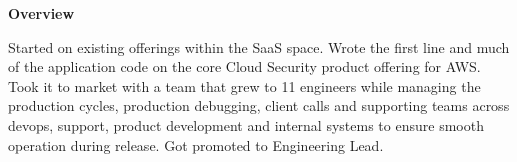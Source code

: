 \documentclass[10pt,a4paper]{altacv}
\begin{document}
\setlength{\parskip}{0pt}


\tagline{}


\begin{fullwidth}
\makecvheader
\end{fullwidth}




\divider
\textbf{Overview}

Started on existing offerings within the SaaS space. Wrote the first line and much of the application code on the core Cloud Security product offering for AWS. Took it to market with a team that grew to 11 engineers while managing the production cycles, production debugging, client calls and supporting teams across devops, support, product development and internal systems to ensure smooth operation during release. 
Got promoted to Engineering Lead.
\newline
\end{document}

